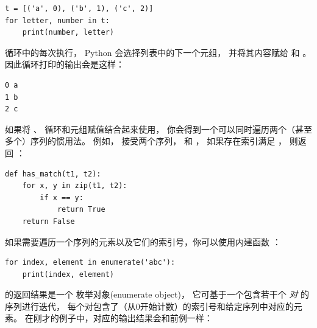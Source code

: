 {\begin{lstlisting}
t = [('a', 0), ('b', 1), ('c', 2)]
for letter, number in t:
    print(number, letter)
\end{lstlisting}

%

循环中的每次执行， Python 会选择列表中的下一个元组，
并将其内容赋给   和  。  
因此循环打印的输出会是这样：

\begin{lstlisting}
0 a
1 b
2 c
\end{lstlisting}

%

如果将 、 循环和元组赋值结合起来使用， 
你会得到一个可以同时遍历两个（甚至多个）序列的惯用法。  
例如，  接受两个序列，  和 ， 
如果存在索引满足  ， 则返回 ：

\begin{lstlisting}
def has_match(t1, t2):
    for x, y in zip(t1, t2):
        if x == y:
            return True
    return False
\end{lstlisting}

%

如果需要遍历一个序列的元素以及它们的索引号，你可以使用内建函数 ：
  

\begin{lstlisting}
for index, element in enumerate('abc'):
    print(index, element)
\end{lstlisting}

%

 的返回结果是一个 枚举对象(enumerate object)， 
它可基于一个包含若干个 \emph{对} 的序列进行迭代， 
每个对包含了（从0开始计数）的索引号和给定序列中对应的元素。  
在刚才的例子中，对应的输出结果会和前例一样：

}
